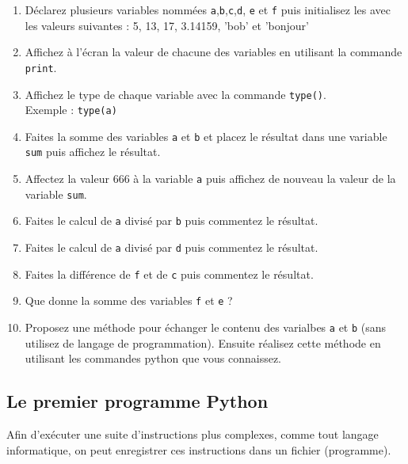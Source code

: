 \begin{enumerate}

\item Déclarez plusieurs variables nommées \texttt{a},\texttt{b},\texttt{c},\texttt{d}, \texttt{e} et \texttt{f}
            puis initialisez les avec les valeurs suivantes : 5, 13, 17, 3.14159, 'bob' et 'bonjour'

\item Affichez à l'écran la valeur de chacune des variables en utilisant la commande \texttt{print}.

\item Affichez le type de chaque variable avec la commande \texttt{type()}.\\
  Exemple : \texttt{type(a)}

\item Faites la somme des variables \texttt{a} et \texttt{b} et placez le
  résultat dans une variable \texttt{sum} puis affichez le résultat.

\item Affectez la valeur 666 à la variable \texttt{a} puis affichez de nouveau la valeur de la variable \texttt{sum}.

\item Faites le calcul de \texttt{a} divisé par \texttt{b} puis commentez le résultat.

\item Faites le calcul de \texttt{a} divisé par \texttt{d} puis commentez le résultat.

\item Faites la différence de \texttt{f} et de \texttt{c} puis commentez le résultat.

\item Que donne la somme des variables \texttt{f} et \texttt{e} ?

\item Proposez une méthode pour échanger le contenu des varialbes \texttt{a} et \texttt{b} (sans utilisez de langage de programmation).
  Ensuite réalisez cette méthode en utilisant les commandes python que vous connaissez.

\end{enumerate}


\subsection{Le premier programme Python}

Afin d'exécuter une suite d'instructions plus complexes,
comme tout langage informatique, on peut enregistrer ces
instructions dans un fichier (programme).


